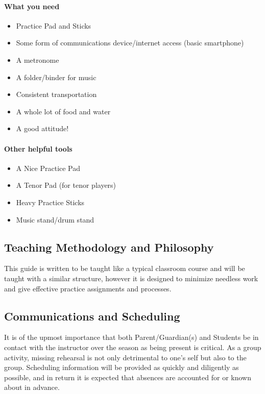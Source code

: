 \documentclass[12pt,letterpaper]{book}
\begin{document}
\paragraph{What you need}
\begin{itemize}
    \item Practice Pad and Sticks
    \item Some form of communications device/internet access (basic smartphone)
    \item A metronome
    \item A folder/binder for music
    \item Consistent transportation
    \item A whole lot of food and water
    \item A good attitude!
\end{itemize}

\paragraph{Other helpful tools}
\begin{itemize}
    \item A Nice Practice Pad
    \item A Tenor Pad (for tenor players)
    \item Heavy Practice Sticks
    \item Music stand/drum stand
\end{itemize}

\subsection*{Teaching Methodology and Philosophy}
This guide is written to be taught like a typical classroom course and will be taught with a similar structure, however it is designed to minimize needless work and give effective practice assignments and processes.

\subsection*{Communications and Scheduling}
It is of the upmost importance that both Parent/Guardian(s) and Students be in contact with the instructor over the season as being present is critical.  As a group activity, missing rehearsal is not only detrimental to one's self but also to the group.  Scheduling information will be provided as quickly and diligently as possible, and in return it is expected that absences are accounted for or known about in advance.  
\end{document}
